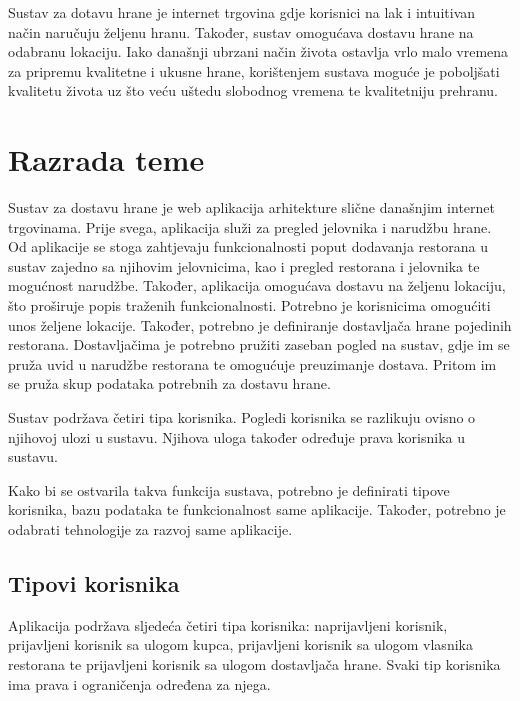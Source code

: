 \documentclass[times, utf8, zavrsni, numeric]{fer}
\begin{document}
Sustav za dotavu hrane je internet trgovina gdje korisnici na lak i intuitivan način naručuju željenu hranu. Također, sustav omogućava dostavu hrane na odabranu lokaciju. Iako današnji ubrzani način života ostavlja vrlo malo vremena za pripremu kvalitetne i ukusne hrane, korištenjem sustava moguće je poboljšati kvalitetu života uz što veću uštedu slobodnog vremena te kvalitetniju prehranu.
\chapter{Razrada teme}
Sustav za dostavu hrane je web aplikacija arhitekture slične današnjim internet trgovinama. Prije svega, aplikacija služi za pregled jelovnika i narudžbu hrane. Od aplikacije se stoga zahtjevaju funkcionalnosti poput dodavanja restorana u sustav zajedno sa njihovim jelovnicima, kao i pregled restorana i jelovnika te mogućnost narudžbe. Također, aplikacija omogućava dostavu na željenu lokaciju, što proširuje popis traženih funkcionalnosti. Potrebno je korisnicima omogućiti unos željene lokacije. Također, potrebno je definiranje dostavljača hrane pojedinih restorana. Dostavljačima je potrebno pružiti zaseban pogled na sustav, gdje im se pruža uvid u narudžbe restorana te omogućuje preuzimanje dostava. Pritom im se pruža skup podataka potrebnih za dostavu hrane. 

Sustav podržava četiri tipa korisnika. Pogledi korisnika se razlikuju ovisno o njihovoj ulozi u sustavu. Njihova uloga također određuje prava korisnika u sustavu.

Kako bi se ostvarila takva funkcija sustava, potrebno je definirati tipove korisnika, bazu podataka te funkcionalnost same aplikacije. Također, potrebno je odabrati tehnologije za razvoj same aplikacije.  
\section{Tipovi korisnika}
Aplikacija podržava sljedeća četiri tipa korisnika: naprijavljeni korisnik, prijavljeni korisnik sa ulogom kupca, prijavljeni korisnik sa ulogom vlasnika restorana te prijavljeni korisnik sa ulogom dostavljača hrane. Svaki tip korisnika ima prava i ograničenja određena za njega.
\end{document}
